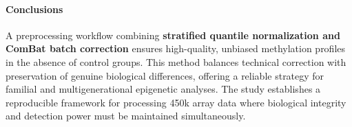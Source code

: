 \documentclass[10pt]{extarticle}
\begin{document}
\paragraph{Conclusions}
A preprocessing workflow combining \textbf{stratified quantile normalization and ComBat batch correction} ensures high-quality, unbiased methylation profiles in the absence of control groups. This method balances technical correction with preservation of genuine biological differences, offering a reliable strategy for familial and multigenerational epigenetic analyses. The study establishes a reproducible framework for processing 450k array data where biological integrity and detection power must be maintained simultaneously.


\section{}

\section{}



\printbibliography
\end{document}
